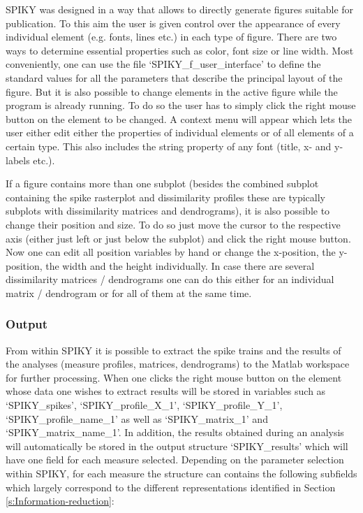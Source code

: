 \documentclass[10pt,twocolumn]{elsart5p}
\begin{document}
SPIKY was designed in a way that allows to directly generate figures suitable for publication. To this aim the user is given control over the appearance of every individual element (e.g. fonts, lines etc.) in each type of figure. There are two ways to determine essential properties such as color, font size or line width. Most conveniently, one can use the file `SPIKY\_f\_user\_interface' to define the standard values for all the parameters that describe the principal layout of the figure. But it is also possible to change elements in the active figure while the program is already running. To do so the user has to simply click the right mouse button on the element to be changed. A context menu will appear which lets the user either edit either the properties of individual elements or of all elements of a certain type. This also includes the string property of any font (title, x- and y-labels etc.).

If a figure contains more than one subplot (besides the combined subplot containing the spike rasterplot and dissimilarity profiles these are typically subplots with dissimilarity matrices and dendrograms), it is also possible to change their position and size. To do so just move the cursor to the respective axis (either just left or just below the subplot) and click the right mouse button. Now one can edit all position variables by hand or change the x-position, the y-position, the width and the height individually. In case there are several dissimilarity matrices / dendrograms one can do this either for an individual matrix / dendrogram or for all of them at the same time.


\subsubsection{\label{sss:Output} Output}

From within SPIKY it is possible to extract the spike trains and the results of the analyses (measure profiles, matrices, dendrograms) to the Matlab workspace for further processing. When one clicks the right mouse button on the element whose data one wishes to extract results will be stored in variables such as `SPIKY\_spikes', `SPIKY\_profile\_X\_1', `SPIKY\_profile\_Y\_1', `SPIKY\_profile\_name\_1' as well as `SPIKY\_matrix\_1' and `SPIKY\_matrix\_name\_1'. In addition, the results obtained during an analysis will automatically be stored in the output structure `SPIKY\_results' which will have one field for each measure selected. Depending on the parameter selection within SPIKY, for each measure the structure can contains the following subfields which largely correspond to the different representations identified in Section \ref{s:Information-reduction}:
\end{document}
